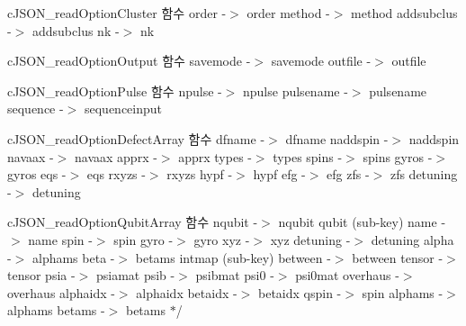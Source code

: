 c\-J\-S\-O\-N\-\_\-read\-Option\-Cluster 함수 order -\/$>$ order method -\/$>$ method addsubclus -\/$>$ addsubclus nk -\/$>$ nk

c\-J\-S\-O\-N\-\_\-read\-Option\-Output 함수 savemode -\/$>$ savemode outfile -\/$>$ outfile

c\-J\-S\-O\-N\-\_\-read\-Option\-Pulse 함수 npulse -\/$>$ npulse pulsename -\/$>$ pulsename sequence -\/$>$ sequenceinput

c\-J\-S\-O\-N\-\_\-read\-Option\-Defect\-Array 함수 dfname -\/$>$ dfname naddspin -\/$>$ naddspin navaax -\/$>$ navaax apprx -\/$>$ apprx types -\/$>$ types spins -\/$>$ spins gyros -\/$>$ gyros eqs -\/$>$ eqs rxyzs -\/$>$ rxyzs hypf -\/$>$ hypf efg -\/$>$ efg zfs -\/$>$ zfs detuning -\/$>$ detuning

c\-J\-S\-O\-N\-\_\-read\-Option\-Qubit\-Array 함수 nqubit -\/$>$ nqubit qubit (sub-\/key) name -\/$>$ name spin -\/$>$ spin gyro -\/$>$ gyro xyz -\/$>$ xyz detuning -\/$>$ detuning alpha -\/$>$ alphams beta -\/$>$ betams intmap (sub-\/key) between -\/$>$ between tensor -\/$>$ tensor psia -\/$>$ psiamat psib -\/$>$ psibmat psi0 -\/$>$ psi0mat overhaus -\/$>$ overhaus alphaidx -\/$>$ alphaidx betaidx -\/$>$ betaidx qspin -\/$>$ spin alphams -\/$>$ alphams betams -\/$>$ betams $\ast$/ 